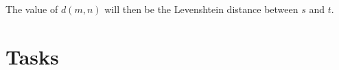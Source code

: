 The value of \( d(m, n) \) will then be the Levenshtein distance between \( s \) and \( t \).


\section{Tasks}

